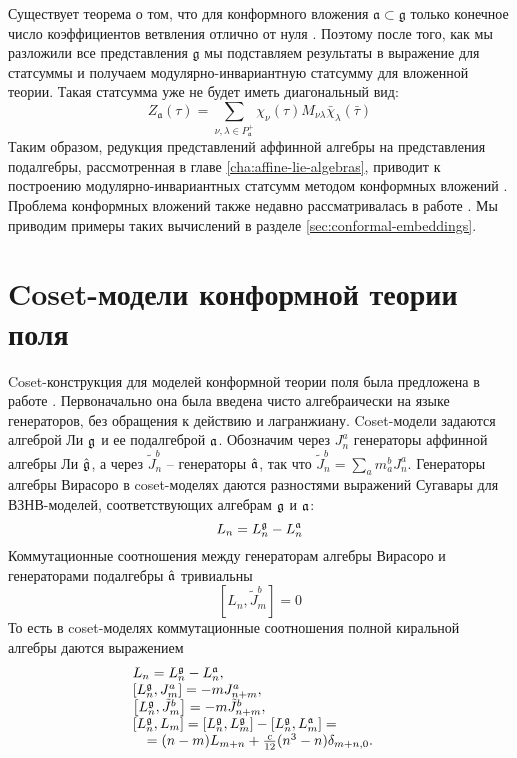 Существует теорема о том, что для конформного вложения  $\mathfrak{a}\subset\mathfrak{g}$ только
конечное число коэффициентов ветвления отлично от нуля \cite{kac1988modular,altschuler1990branching}. Поэтому после того, как мы разложили все
представления $\mathfrak{g}$ мы подставляем результаты в выражение для статсуммы и получаем
модулярно-инвариантную статсумму для вложенной теории. Такая статсумма уже не будет иметь
диагональный вид:
\begin{equation}
  \label{eq:36}
   Z_{\mathfrak{a}}(\tau)=\sum_{ \nu,\lambda\in P^{+}_{\mathfrak{a}}} \chi_{\nu}(\tau)M_{\nu\lambda}\bar \chi_{\lambda}(\bar \tau)
\end{equation}
Таким образом, редукция представлений аффинной алгебры на представления подалгебры, рассмотренная в главе \ref{cha:affine-lie-algebras}, приводит к построению модулярно-инвариантных статсумм методом конформных вложений \cite{walton1989conformal}. Проблема конформных вложений также недавно рассматривалась в работе \cite{coquereaux2008conformal}.  Мы приводим примеры таких вычислений в разделе \ref{sec:conformal-embeddings}.

\section{Coset-модели конформной теории поля}
\label{sec:coset-models-cft}


Coset-конструкция для моделей конформной теории поля была предложена в работе \cite{Goddard198588}. Первоначально она была введена чисто алгебраически на языке генераторов, без обращения к действию и лагранжиану.  Coset-модели задаются алгеброй Ли $\mathfrak{g}$ и ее подалгеброй $\mathfrak{a}$. Обозначим через $J_{n}^{a}$ генераторы аффинной алгебры Ли $\hat{\mathfrak{g}}$, а через $\tilde{J}_{n}^{b}$ -- генераторы $\hat{\mathfrak{a}}$, так что $\tilde{J}^{b}_{n}=\sum_{a} m_{a}^{b} J^{a}_{n}$. Генераторы алгебры Вирасоро в coset-моделях даются разностями выражений Сугавары для ВЗНВ-моделей, соответствующих алгебрам  $\mathfrak{g}$ и $\mathfrak{a}$:
\begin{equation*}
  L_{n}=L_{n}^{\mathfrak{g}}-L_{n}^{\mathfrak{a}}
\end{equation*}
Коммутационные соотношения между генераторам алгебры Вирасоро и генераторами подалгебры  $\hat{\mathfrak{a}}$ тривиальны
\begin{equation}
  \label{eq:26}
  \left[L_{n},\tilde{J}^{b}_{m}\right]=0
\end{equation}
То есть в coset-моделях коммутационные соотношения полной киральной алгебры даются выражением
\begin{equation}
\label{eq:183}
\begin{array}{ll}
  L_{n}= L_{n}^{\mathfrak{g}}-L_{n}^{\mathfrak{a}}, &\\
  \left[L_{n}^{\mathfrak{g}},J^{a}_{m}\right]= -m J^{a}_{n+m},&\\
  \left[L_{n}^{\mathfrak{g}},\tilde{J}^{b}_{m}\right]=-m\tilde{J}^{b}_{n+m},&\\
  \left[L_{n}^{\mathfrak{g}},L_{m}\right]=[L_{n}^{\mathfrak{g}},L_{m}^{\mathfrak{g}}]-[L_{n}^{\mathfrak{g}},L_{m}^{\mathfrak{a}}]=&\\
  \quad =(n-m)L_{m+n}+\frac{c}{12}(n^{3}-n)\delta_{m+n,0}.&
\end{array}
\end{equation}

